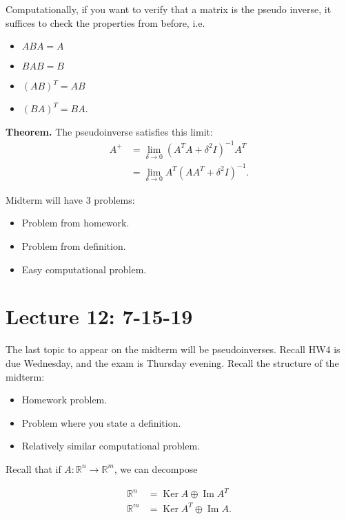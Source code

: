 \documentclass{article}
\newcommand{\RR}{\mathbb{R}}
\DeclareMathOperator{\Ker}{Ker}
\DeclareMathOperator{\Ima}{Im}
\DeclareMathOperator{\Ima}{Im}
\begin{document}
    Computationally, if you want to verify that a matrix is the pseudo inverse, it suffices to check the properties from before, i.e.
    \begin{itemize}
      \item $ABA = A$
      \item $BAB = B$
      \item $(AB)^T = AB$
      \item $(BA)^T = BA$.
    \end{itemize}

    {\bf Theorem.} The pseudoinverse satisfies this limit:
    \begin{align*}
      A^{+} &= \lim_{\delta \to 0} \left( A^T A + \delta^2 I \right)^{-1} A^T \\
      &= \lim_{\delta \to 0} A^T (A A^T  +\delta^2 I)^{-1}.
    \end{align*}

    Midterm will have 3 problems:

    \begin{itemize}
      \item Problem from homework.
      \item Problem from definition.
      \item Easy computational problem.
    \end{itemize}

    \section{Lecture 12: 7-15-19}

    The last topic to appear on the midterm will be pseudoinverses.  Recall HW4 is due Wednesday, and the exam is Thursday evening.  Recall the structure of the midterm:

    \begin{itemize}
      \item Homework problem.
      \item Problem where you state a definition.
      \item Relatively similar computational problem.
    \end{itemize}

Recall that if $A: \RR^n \to \RR^m$, we can decompose

\begin{align*}
  \RR^n &= \Ker A \oplus \Ima A^T \\
  \RR^m &= \Ker A^T \oplus \Ima A.
\end{align*}
\end{document}

